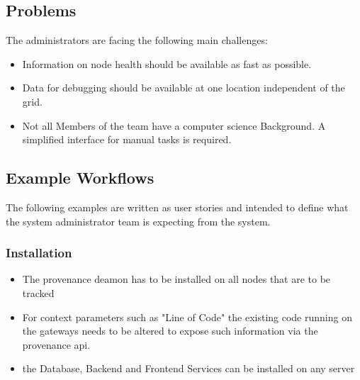 \subsection{Problems}

The administrators are facing the following main challenges:

\begin{itemize}
  \item Information on node health should be available as fast as possible.
  \item Data for debugging should be available at one location independent of the grid.
  \item Not all Members of the team have a computer science Background. A simplified interface for manual tasks is required.
\end{itemize}




\subsection{Example Workflows}

The following examples are written as user stories and intended to define what the system administrator team is expecting from the system.

\subsubsection{Installation}
\begin{itemize}
  \item The provenance deamon has to be installed on all nodes that are to be tracked
  \item For context parameters such as "Line of Code" the existing code running on the gateways needs to be altered to expose such information via the provenance api.
  \item the Database, Backend and Frontend Services can be installed on any server
\end{itemize}

